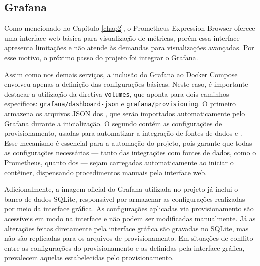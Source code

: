 \subsection{Grafana}
\label{subsection:GrafanaVisualizacao}

Como mencionado no Capítulo \ref{chap2}, o Prometheus Expression Browser oferece uma interface web básica para visualização de métricas, porém essa interface apresenta limitações e não atende às demandas para visualizações avançadas. Por esse motivo, o próximo passo do projeto foi integrar o Grafana.

Assim como nos demais serviços, a inclusão do Grafana ao Docker Compose envolveu apenas a definição das configurações básicas. Neste caso, é importante destacar a utilização da diretiva \verb|volumes|, que aponta para dois caminhos específicos: \verb|grafana/dashboard-json| e \verb|grafana/provisioning|. O primeiro armazena os arquivos JSON dos , que serão importados automaticamente pelo Grafana durante a inicialização. O segundo contém as configurações de provisionamento, usadas para automatizar a integração de fontes de dados e . Esse mecanismo é essencial para a automação do projeto, pois garante que todas as configurações necessárias --- tanto das integrações com fontes de dados, como o Prometheus, quanto dos  --- sejam carregadas automaticamente ao iniciar o contêiner, dispensando procedimentos manuais pela interface web.

Adicionalmente, a imagem oficial do Grafana utilizada no projeto já inclui o banco de dados SQLite, responsável por armazenar as configurações realizadas por meio da interface gráfica. As configurações aplicadas via provisionamento são acessíveis em modo  na interface e não podem ser modificadas manualmente. Já as alterações feitas diretamente pela interface gráfica são gravadas no SQLite, mas não são replicadas para os arquivos de provisionamento. Em situações de conflito entre as configurações do provisionamento e as definidas pela interface gráfica, prevalecem aquelas estabelecidas pelo provisionamento.

